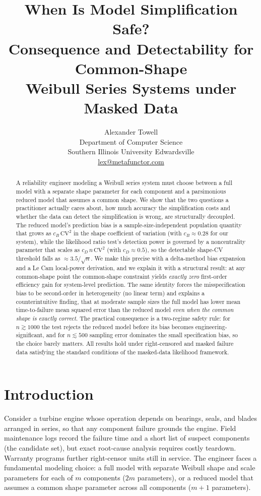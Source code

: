 \documentclass[11pt]{article}
\title{When Is Model Simplification Safe?\\
Consequence and Detectability for Common-Shape\\
Weibull Series Systems under Masked Data}
\author{
  \Large{Alexander Towell} \\
  Department of Computer Science \\
  Southern Illinois University Edwardsville \\
  \href{mailto:lex@metafunctor.com}{lex@metafunctor.com}
}
\date{}
\newcommand{\CV}{\mathrm{CV}}
\begin{document}
\maketitle

\begin{abstract}
A reliability engineer modeling a Weibull series system must choose between a full model with a separate shape parameter for each component and a parsimonious reduced model that assumes a common shape. We show that the two questions a practitioner actually cares about, how much accuracy the simplification costs and whether the data can detect the simplification is wrong, are structurally decoupled. The reduced model's prediction bias is a sample-size-independent population quantity that grows as $c_B\,\CV^2$ in the shape coefficient of variation (with $c_B \approx 0.28$ for our system), while the likelihood ratio test's detection power is governed by a noncentrality parameter that scales as $c_D\,n\,\CV^2$ (with $c_D \approx 0.5$), so the detectable shape-CV threshold falls as $\approx 3.5/\sqrt{n}$. We make this precise with a delta-method bias expansion and a Le Cam local-power derivation, and we explain it with a structural result: at any common-shape point the common-shape constraint yields \emph{exactly zero} first-order efficiency gain for system-level prediction. The same identity forces the misspecification bias to be second-order in heterogeneity (no linear term) and explains a counterintuitive finding, that at moderate sample sizes the full model has lower mean time-to-failure mean squared error than the reduced model \emph{even when the common shape is exactly correct}. The practical consequence is a two-regime safety rule: for $n \gtrsim 1000$ the test rejects the reduced model before its bias becomes engineering-significant, and for $n \lesssim 500$ sampling error dominates the small specification bias, so the choice barely matters. All results hold under right-censored and masked failure data satisfying the standard conditions of the masked-data likelihood framework.
\end{abstract}

\section{Introduction}

Consider a turbine engine whose operation depends on bearings, seals, and blades arranged in series, so that any component failure grounds the engine. Field maintenance logs record the failure time and a short list of suspect components (the candidate set), but exact root-cause analysis requires costly teardown. Warranty programs further right-censor units still in service. The engineer faces a fundamental modeling choice: a full model with separate Weibull shape and scale parameters for each of $m$ components ($2m$ parameters), or a reduced model that assumes a common shape parameter across all components ($m+1$ parameters).
\end{document}
